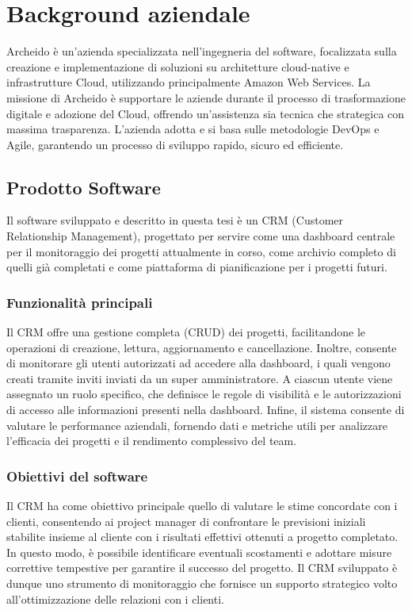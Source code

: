 \documentclass[target=bach,aauheader=,style=]{thud}
\begin{document}
\chapter{Background aziendale}
Archeido \cite{archeido2024} è un'azienda specializzata nell'ingegneria del software, focalizzata sulla creazione e implementazione di soluzioni su architetture cloud-native e infrastrutture Cloud, utilizzando principalmente Amazon Web Services. La missione di Archeido è supportare le aziende durante il processo di trasformazione digitale e adozione del Cloud, offrendo un'assistenza sia tecnica che strategica con massima trasparenza. L'azienda adotta e si basa sulle metodologie DevOps e Agile, garantendo un processo di sviluppo rapido, sicuro ed efficiente.

\section{Prodotto Software}
Il software sviluppato e descritto in questa tesi è un CRM (Customer Relationship Management), progettato per servire come una dashboard centrale per il monitoraggio dei progetti attualmente in corso, come archivio completo di quelli già completati e come piattaforma di pianificazione per i progetti futuri.

\subsection{Funzionalità principali}
Il CRM offre una gestione completa (CRUD) dei progetti, facilitandone le operazioni di creazione, lettura, aggiornamento e cancellazione. Inoltre, consente di monitorare gli utenti autorizzati ad accedere alla dashboard, i quali vengono creati tramite inviti inviati da un super amministratore. A ciascun utente viene assegnato un ruolo specifico, che definisce le regole di visibilità e le autorizzazioni di accesso alle informazioni presenti nella dashboard. Infine, il sistema consente di valutare le performance aziendali, fornendo dati e metriche utili per analizzare l'efficacia dei progetti e il rendimento complessivo del team.

\subsection{Obiettivi del software}
Il CRM ha come obiettivo principale quello di valutare le stime concordate con i clienti, consentendo ai project manager di confrontare le previsioni iniziali stabilite insieme al cliente con i risultati effettivi ottenuti a progetto completato. In questo modo, è possibile identificare eventuali scostamenti e adottare misure correttive tempestive per garantire il successo del progetto. Il CRM sviluppato è dunque uno strumento di monitoraggio che fornisce un supporto strategico volto all'ottimizzazione delle relazioni con i clienti.
\end{document}
